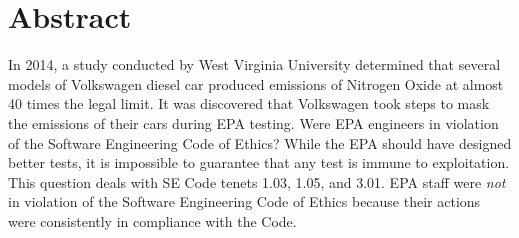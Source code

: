 \section*{Abstract}
In 2014, a study\cite{study} conducted by West Virginia University determined that several models of Volkswagen diesel car\cite{emissions_cars_affected} produced emissions of Nitrogen Oxide at almost 40 times the legal limit\cite{study}. It was discovered that Volkswagen took steps to mask the emissions of their cars during EPA testing\cite{cheating_analysis}. Were EPA engineers in violation of the Software Engineering Code of Ethics? While the EPA should have designed better tests\cite{epa_track}, it is impossible to guarantee that any test is immune to exploitation. This question deals with SE Code\cite{se_code} tenets 1.03, 1.05, and 3.01. EPA staff were \textit{not} in violation of the Software Engineering Code of Ethics because their actions were consistently in compliance with the Code.